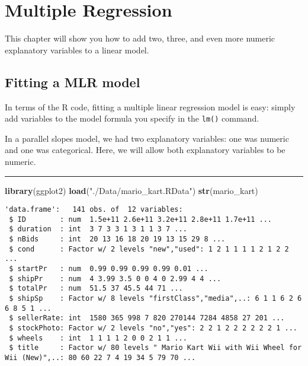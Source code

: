 \documentclass[]{book}
\newenvironment{Shaded}{\begin{snugshade}}{\end{snugshade}}
\newcommand{\KeywordTok}[1]{\textcolor[rgb]{0.13,0.29,0.53}{\textbf{#1}}}
\newcommand{\StringTok}[1]{\textcolor[rgb]{0.31,0.60,0.02}{#1}}
\newcommand{\NormalTok}[1]{#1}
\begin{document}
\chapter{Multiple Regression}\label{multiple-regression}

This chapter will show you how to add two, three, and even more numeric
explanatory variables to a linear model.

\section{Fitting a MLR model}\label{fitting-a-mlr-model}

In terms of the R code, fitting a multiple linear regression model is
easy: simply add variables to the model formula you specify in the
\texttt{lm()} command.

In a parallel slopes model, we had two explanatory variables: one was
numeric and one was categorical. Here, we will allow both explanatory
variables to be numeric.

\begin{center}\rule{0.5\linewidth}{\linethickness}\end{center}

\begin{Shaded}
\begin{Highlighting}[]
\KeywordTok{library}\NormalTok{(ggplot2)}
\KeywordTok{load}\NormalTok{(}\StringTok{"./Data/mario_kart.RData"}\NormalTok{)}
\KeywordTok{str}\NormalTok{(mario_kart)}
\end{Highlighting}
\end{Shaded}

\begin{verbatim}
'data.frame':   141 obs. of  12 variables:
 $ ID        : num  1.5e+11 2.6e+11 3.2e+11 2.8e+11 1.7e+11 ...
 $ duration  : int  3 7 3 3 1 3 1 1 3 7 ...
 $ nBids     : int  20 13 16 18 20 19 13 15 29 8 ...
 $ cond      : Factor w/ 2 levels "new","used": 1 2 1 1 1 1 2 1 2 2 ...
 $ startPr   : num  0.99 0.99 0.99 0.99 0.01 ...
 $ shipPr    : num  4 3.99 3.5 0 0 4 0 2.99 4 4 ...
 $ totalPr   : num  51.5 37 45.5 44 71 ...
 $ shipSp    : Factor w/ 8 levels "firstClass","media",..: 6 1 1 6 2 6 6 8 5 1 ...
 $ sellerRate: int  1580 365 998 7 820 270144 7284 4858 27 201 ...
 $ stockPhoto: Factor w/ 2 levels "no","yes": 2 2 1 2 2 2 2 2 2 1 ...
 $ wheels    : int  1 1 1 1 2 0 0 2 1 1 ...
 $ title     : Factor w/ 80 levels " Mario Kart Wii with Wii Wheel for Wii (New)",..: 80 60 22 7 4 19 34 5 79 70 ...
\end{verbatim}
\end{document}
